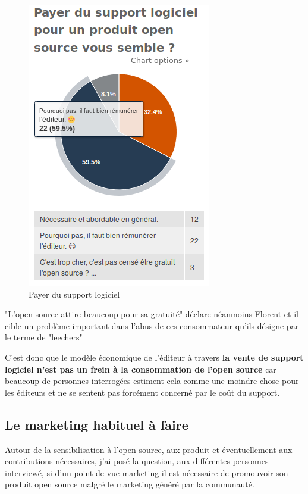 			\begin{figure}[!htb]
				\center
				\includegraphics[scale=0.58]{./img/a11}
				\caption{Payer du support logiciel}					
			\end{figure}


			"L'open source attire beaucoup pour sa gratuité" déclare néanmoins Florent  et il cible un problème important dans l'abus de ces consommateur qu'ils désigne par le terme de "\gls{leechers}"
			\begin{center}
					\textit{
					}
				\end{center}

			C'est donc que le modèle économique de l'éditeur à travers \textbf{la vente de support logiciel n'est pas un frein à la consommation de l'open source} car beaucoup de personnes interrogées estiment cela comme une moindre chose pour les éditeurs et ne se sentent pas forcément concerné par le coût du support.

		\subsection{Le marketing habituel à faire}

			Autour de la sensibilisation à l'open source, aux produit et éventuellement aux contributions nécessaires, j'ai posé la question, aux différentes personnes interviewé, si d'un point de vue marketing il est nécessaire de promouvoir son produit open source malgré le marketing généré par la communauté.

